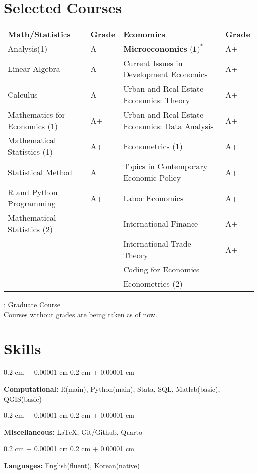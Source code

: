 \documentclass[10pt, letterpaper]{article}
\newenvironment{onecolentry}{
	\begin{adjustwidth}{
			0.2 cm + 0.00001 cm
		}{
			0.2 cm + 0.00001 cm
		}
	}{
	\end{adjustwidth}
} %
\begin{document}
\section{Selected Courses}
\setlength{\tabcolsep}{3pt}
\begin{tabularx}{\textwidth}{|>{\centering\arraybackslash}X|>{\centering\arraybackslash}p{1cm}|>{\centering\arraybackslash}p{7
			cm}|>{\centering\arraybackslash}p{1cm}|}
	\hline
	\textbf{Math/Statistics} & \textbf{Grade} & \textbf{Economics} & \textbf{Grade} \\
	\hhline{|=|=|=|=|}
	Analysis(1) & A & $\textbf{Microeconomics (1)}^{*}$ &A+ \\ \hline
	Linear Algebra & A& Current Issues in Development Economics & A+\\ \hline
	Calculus&A-&Urban and Real Estate Economics: Theory&A+\\ \hline
	Mathematics for Economics (1)&A+&Urban and Real Estate Economics: Data Analysis&A+\\ \hline
	Mathematical Statistics (1)&A+&Econometrics (1)& A+\\ \hline
	Statistical Method & A& Topics in Contemporary Economic Policy & A+\\ \hline
	R and Python Programming&A+&Labor Economics&A+\\ \hline
	Mathematical Statistics (2)&& International Finance & A+\\ \hline
	&&International Trade Theory&A+\\ \hline
		&&Coding for Economics&\\ \hline
			&&Econometrics (2)&\\
	
	
	\hline  

\end{tabularx}
\noindent *: Graduate Course\\
\noindent Courses without grades are being taken as of now.
	

	\section{Skills}
	
	\begin{onecolentry}
		\textbf{Computational:} R(main), Python(main), Stata, SQL, Matlab(basic), QGIS(basic)
	\end{onecolentry}
	
	\vspace{0.2 cm}
	
	\begin{onecolentry}
		\textbf{Miscellaneous:} \LaTeX, Git/Github, Quarto
	\end{onecolentry}
	
	\vspace{0.2 cm}
	
	\begin{onecolentry}
		\textbf{Languages:} English(fluent), Korean(native)
	\end{onecolentry}
	
	
	
	
\end{document}
